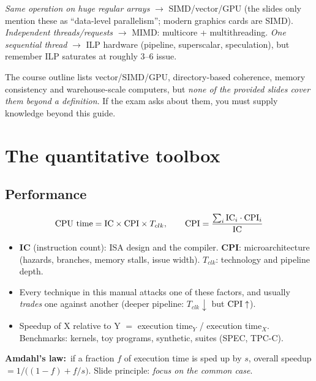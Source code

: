 \begin{dec}
\emph{Same operation on huge regular arrays} $\rightarrow$ SIMD/vector/GPU (the slides only mention these as ``data-level parallelism''; modern graphics cards are SIMD). \emph{Independent threads/requests} $\rightarrow$ MIMD: multicore + multithreading. \emph{One sequential thread} $\rightarrow$ ILP hardware (pipeline, superscalar, speculation), but remember ILP saturates at roughly 3--6 issue.
\end{dec}

\begin{trap}
The course outline lists vector/SIMD/GPU, directory-based coherence, memory consistency and warehouse-scale computers, but \emph{none of the provided slides cover them beyond a definition}. If the exam asks about them, you must supply knowledge beyond this guide.
\end{trap}

\section{The quantitative toolbox}
\subsection{Performance}
\[
\text{CPU time}=\text{IC}\times\mathrm{CPI}\times T_{clk},\qquad
\mathrm{CPI}=\frac{\sum_i \text{IC}_i\cdot\mathrm{CPI}_i}{\text{IC}}
\]
\begin{itemize}
\item \textbf{IC} (instruction count): ISA design and the compiler. \textbf{CPI}: microarchitecture (hazards, branches, memory stalls, issue width). \textbf{$T_{clk}$}: technology and pipeline depth.
\item Every technique in this manual attacks one of these factors, and usually \emph{trades} one against another (deeper pipeline: $T_{clk}\downarrow$ but $\mathrm{CPI}\uparrow$).
\item Speedup of X relative to Y $=$ execution time$_Y$ / execution time$_X$. Benchmarks: kernels, toy programs, synthetic, suites (SPEC, TPC-C).
\end{itemize}
\textbf{Amdahl's law:}\bs\ if a fraction $f$ of execution time is sped up by $s$, overall speedup $=1/\big((1-f)+f/s\big)$. Slide principle: \emph{focus on the common case}.

